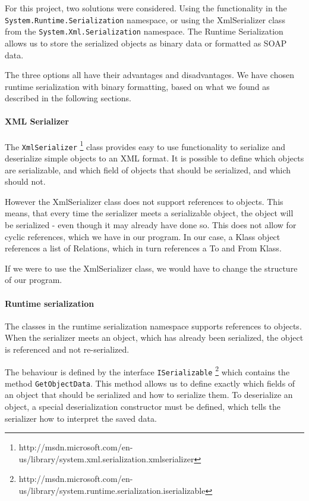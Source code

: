 For this project, two solutions were considered. Using the functionality in the
\texttt{System.Runtime.Serialization} namespace, or using the XmlSerializer
class from the \texttt{System.Xml.Serialization} namespace. The Runtime
Serialization allows us to store the serialized objects as binary data or
formatted as SOAP data.

The three options all have their advantages and disadvantages. We have chosen
runtime serialization with binary formatting, based on what we found as
described in the following sections.

\paragraph{XML Serializer}

The \texttt{XmlSerializer}
\footnote{http://msdn.microsoft.com/en-us/library/system.xml.serialization.xmlserializer} 
class provides easy to use
functionality to serialize and deserialize simple objects to an XML format. It
is possible to define which objects are serializable, and which field of objects
that should be serialized, and which should not.

However the XmlSerializer class does not support references to objects. This
means, that every time the serializer meets a serializable object, the object
will be serialized - even though it may already have done so. This does not
allow for cyclic references, which we have in our program. In our case, a Klass
object references a list of Relations, which in turn references a To and From
Klass.

If we were to use the XmlSerializer class, we would have to change the structure
of our program.

\paragraph{Runtime serialization}

The classes in the runtime serialization
namespace supports references to objects. When the serializer meets an object,
which has already been serialized, the object is referenced and not
re-serialized.

The behaviour is defined by the interface \texttt{ISerializable}
\footnote{http://msdn.microsoft.com/en-us/library/system.runtime.serialization.iserializable}
which contains the method \texttt{GetObjectData}. This method allows us to 
define exactly which fields of an object that should be serialized and how to 
serialize them. To deserialize an object, a special deserialization constructor 
must be defined, which tells the serializer how to interpret the saved data.

